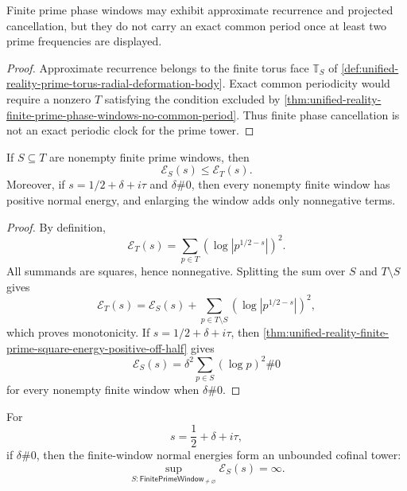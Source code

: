\begin{corollary}
\label{cor:unified-reality-finite-phase-closure-quasiperiodic-data}
Finite prime phase windows may exhibit approximate recurrence and
projected cancellation, but they do not carry an exact common period once
at least two prime frequencies are displayed.
\end{corollary}

\begin{proof}
Approximate recurrence belongs to the finite torus face
$\mathbb T_S$ of
\autoref{def:unified-reality-prime-torus-radial-deformation-body}.
Exact common periodicity would require a nonzero $T$ satisfying the
condition excluded by
\autoref{thm:unified-reality-finite-prime-phase-windows-no-common-period}.
Thus finite phase cancellation is not an exact periodic clock for the
prime tower.
\end{proof}

\begin{theorem}
\label{thm:unified-reality-finite-normal-energy-monotone-window}
If $S\subseteq T$ are nonempty finite prime windows, then
$$
\mathcal E_S(s)\le \mathcal E_T(s).
$$
Moreover, if $s=1/2+\delta+i\tau$ and $\delta\#0$, then every nonempty
finite window has positive normal energy, and enlarging the window adds
only nonnegative terms.
\end{theorem}

\begin{proof}
By definition,
$$
\mathcal E_T(s)
=
\sum_{p\in T}
\left(\log |p^{1/2-s}|\right)^2.
$$
All summands are squares, hence nonnegative.  Splitting the sum over
$S$ and $T\setminus S$ gives
$$
\mathcal E_T(s)
=
\mathcal E_S(s)
+
\sum_{p\in T\setminus S}
\left(\log |p^{1/2-s}|\right)^2,
$$
which proves monotonicity.  If $s=1/2+\delta+i\tau$, then
\autoref{thm:unified-reality-finite-prime-square-energy-positive-off-half}
gives
$$
\mathcal E_S(s)
=
\delta^2\sum_{p\in S}(\log p)^2
\#0
$$
for every nonempty finite window when $\delta\#0$.
\end{proof}

\begin{theorem}
\label{thm:unified-reality-finite-to-infinite-energy-divergence}
For
$$
s=\frac12+\delta+i\tau,
$$
if $\delta\#0$, then the finite-window normal energies form an
unbounded cofinal tower:
$$
\sup_{S:\mathsf{FinitePrimeWindow}_{\ne\varnothing}}
\mathcal E_S(s)
=
\infty.
$$
\end{theorem}

